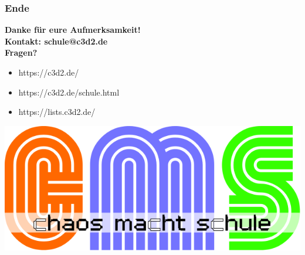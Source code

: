 \documentclass[12pt, table]{beamer}
\begin{document}
\begin{frame}
	\frametitle{Ende}
	\begin{center}
		\textbf{Danke für eure Aufmerksamkeit!} \\
		\textbf{Kontakt: schule@c3d2.de} \\
		\textbf{Fragen?} 
	\end{center}
	\begin{itemize}
		\item<1-> https://c3d2.de/
		\item<2-> https://c3d2.de/schule.html
		\item<4-> https://lists.c3d2.de/  
	\end{itemize}
\end{frame}

\begin{frame}
	\begin{center}
    	\includegraphics[height=0.5\textheight]{../img/cms-text.png}
    \end{center}
\end{frame}
\end{document}
